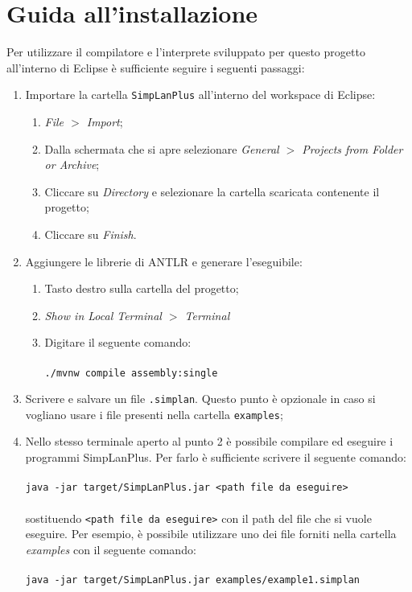 \documentclass[../report.tex]{subfiles}
\begin{document}
\chapter{Guida all'installazione}\label{a:installazione}
Per utilizzare il compilatore e l'interprete sviluppato per questo progetto all'interno di Eclipse \`e sufficiente seguire i seguenti passaggi:
\begin{enumerate}
    \item Importare la cartella \verb|SimpLanPlus| all'interno del workspace di Eclipse:
        \begin{enumerate}
            \item \textit{File $>$ Import};
            \item Dalla schermata che si apre selezionare \textit{General $>$ Projects from Folder or Archive};
            \item Cliccare su \textit{Directory} e selezionare la cartella scaricata contenente il progetto;
            \item Cliccare su \textit{Finish}.
        \end{enumerate}
    \item Aggiungere le librerie di ANTLR e generare l'eseguibile:
            \begin{enumerate}
                \item Tasto destro sulla cartella del progetto;
                \item \textit{Show in Local Terminal $>$ Terminal}
                \item Digitare il seguente comando:\\\\
                    \verb|./mvnw compile assembly:single|
            \end{enumerate}
    \item Scrivere e salvare un file \verb|.simplan|. Questo punto \`e opzionale in caso si vogliano usare i file presenti nella cartella \verb|examples|;
    \item \label{a:pt4}Nello stesso terminale aperto al punto 2 \`e possibile compilare ed eseguire i programmi SimpLanPlus. Per farlo \`e sufficiente scrivere il seguente comando:\\\\
        \verb|java -jar target/SimpLanPlus.jar <path file da eseguire>|\\\\
        sostituendo \verb|<path file da eseguire>| con il path del file che si vuole eseguire. Per esempio, \`e possibile utilizzare uno dei file forniti nella cartella \textit{examples} con il seguente comando:\\\\
        \verb|java -jar target/SimpLanPlus.jar examples/example1.simplan|
\end{enumerate}
\end{document}
